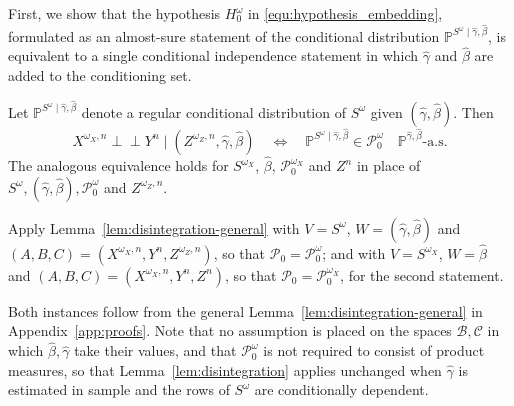\documentclass[twoside,11pt]{article}
\newcommand{\indep}{\perp \!\!\! \perp}
\begin{document}
First, we show that the hypothesis $H_0^\omega$ in \eqref{equ:hypothesis_embedding}, formulated as an almost-sure statement of the conditional distribution $\mathbb{P}^{S^\omega\mid\hat\gamma,\hat\beta}$, is equivalent to a single conditional independence statement in which $\hat\gamma$ and $\hat\beta$ are added to the conditioning set.

\begin{lemmaE}[][end, text link={All proofs are provided in Appendix \ref{app:proofs}.}, text proof={Proof of Lemma~\ref{lem:disintegration}}]\label{lem:disintegration}
Let $\mathbb{P}^{S^\omega\mid\hat\gamma,\hat\beta}$ denote a regular conditional distribution of $S^\omega$ given $(\hat\gamma,\hat\beta)$. Then
\[
  X^{\omega_X,n} \indep Y^n \mid (Z^{\omega_Z,n},\hat\gamma,\hat\beta)
  \quad\Longleftrightarrow\quad
  \mathbb{P}^{S^\omega\mid\hat\gamma,\hat\beta} \in \mathcal{P}_0^\omega
  \quad \mathbb{P}^{\hat\gamma,\hat\beta}\text{-a.s.}
\]
The analogous equivalence holds for $S^{\omega_X}$, $\hat\beta$, $\mathcal{P}_0^{\omega_X}$ and $Z^n$ in place of $S^\omega, (\hat{\gamma},\hat\beta), \mathcal{P}_0^\omega$ and $Z^{\omega_Z,n}$. 
\end{lemmaE}
\begin{proofE}
Apply Lemma~\ref{lem:disintegration-general} with $V=S^\omega$, $W=(\hat\gamma,\hat\beta)$ and $(A,B,C)=(X^{\omega_X,n},Y^n,Z^{\omega_Z,n})$, so that $\mathcal{P}_0=\mathcal{P}_0^\omega$; and with $V=S^{\omega_X}$, $W=\hat\beta$ and $(A,B,C)=(X^{\omega_X,n},Y^n,Z^n)$, so that $\mathcal{P}_0=\mathcal{P}_0^{\omega_X}$, for the second statement.
\end{proofE}

\noindent
Both instances follow from the general Lemma~\ref{lem:disintegration-general} in
Appendix~\ref{app:proofs}. Note that no assumption is placed on the spaces
$\mathcal{B},\mathcal{C}$ in which $\hat\beta,\hat\gamma$ take their values, and
that $\mathcal{P}_0^\omega$ is not required to consist of product measures, so
that Lemma~\ref{lem:disintegration} applies unchanged when $\hat\gamma$ is
estimated in sample and the rows of $S^\omega$ are conditionally dependent.
\end{document}

